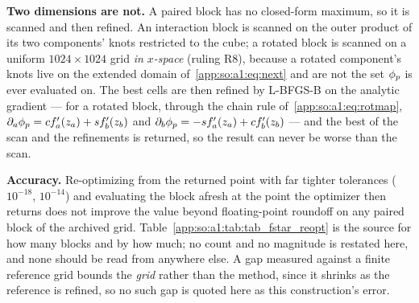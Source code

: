 \textbf{Two dimensions are not.} A paired block has no closed-form maximum, so
it is scanned and then refined. An interaction block is scanned on the outer
product of its two components' knots restricted to the cube; a rotated block
is scanned on a uniform $1024\times1024$ grid \emph{in $x$-space} (ruling R8),
because a rotated component's knots live on the extended domain
of~\eqref{app:so:a1:eq:next} and are not the set $\phi_p$ is ever evaluated on.
The best cells are then refined by L-BFGS-B on the analytic gradient --- for a
rotated block, through the chain rule of~\eqref{app:so:a1:eq:rotmap},
$\partial_a\phi_p=cf_a'(z_a)+sf_b'(z_b)$ and
$\partial_b\phi_p=-sf_a'(z_a)+cf_b'(z_b)$ --- and the best of the scan and the
refinements is returned, so the result can never be worse than the scan.

\textbf{Accuracy.} Re-optimizing from the returned point with far tighter
tolerances ( $10^{-18}$,  $10^{-14}$) and evaluating
the block afresh at the point the optimizer then returns does not improve the
value beyond floating-point roundoff on any paired block of the archived grid.
Table~\ref{app:so:a1:tab:tab_fstar_reopt} is the source for how many blocks
and by how much; no count and no magnitude is restated here, and none should
be read from anywhere else. A gap measured against a finite reference grid
bounds the \emph{grid} rather than the method, since it shrinks as the
reference is refined, so no such gap is quoted here as this construction's
error.

\begin{table}[htbp]
  \centering
  \caption[Convergence of the paired-block maximizations]{
  Convergence of the paired-block maximizations, measured on the
  archived grid, seeds $0$--$9$, $D=\SOnumStudyD$. The gain is a fresh evaluation of
  the block at the point the tighter re-optimization returns, minus the value
  at the point already stored; the projected gradient is L-BFGS-B's own
  first-order criterion at that stored point, with a component pushing out of
  an active bound zeroed. The last row is a different quantity, over the
  components that sit in no interaction and no rotation pair: it is
  $|f_i(x_i^\star)-\max_{\text{grid}} f_i|$, 's
  closed-form one-dimensional maximum against the maximum over a dense uniform
  grid, so it bounds the grid and not
  .}\label{app:so:a1:tab:tab_fstar_reopt}
  \small\setlength{\tabcolsep}{3pt}
  
\end{table}

